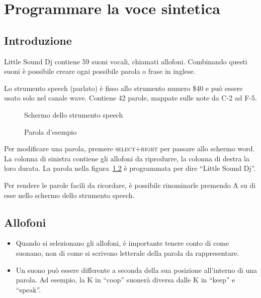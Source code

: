 \chapter{Programmare la voce sintetica}
\label{speech-chapter}

\section{Introduzione}

Little Sound Dj contiene 59 suoni vocali, chiamati allofoni. Combinando questi suoni è possibile creare ogni possibile parola o frase in inglese.

Lo strumento speech (parlato) è fisso allo strumento numero \$40 e può essere usato solo nel canale wave. Contiene 42 parole, mappate sulle note da C-2 ad F-5.

\begin{figure}[htpb]
	\begin{center}
	\end{center}
	\caption{Schermo dello strumento speech}
	\label{fig:speech}
\end{figure}
\begin{figure}[htpb]
	\begin{center}
	\end{center}
	\caption{Parola d'esempio}
	\label{fig:word}
\end{figure}

Per modificare una parola, premere \textsc{select+right} per passare allo schermo word. La colonna di sinistra contiene gli allofoni da riprodurre, la colonna di destra la loro durata. La parola nella figura~\ref{fig:word} è programmata per dire ``Little Sound Dj''.

Per rendere le parole facili da ricordare, è possibile rinominarle premendo A su di esse nello schermo dello strumento speech.

\section{Allofoni}

\begin{itemize}
\item Quando si selezionano gli allofoni, è importante tenere conto di come suonano, non di come si scrivono letterale della parola da rappresentare.
\item Un suono può essere differente a seconda della sua posizione all'interno di una parola. Ad esempio, la K in ``coop'' suonerà diversa dalle K in ``keep'' e ``speak''.
\end{itemize}

